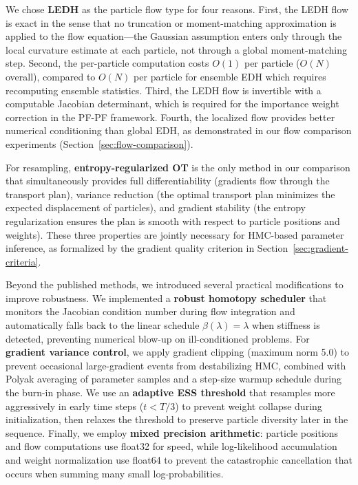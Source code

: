 \documentclass[12pt,a4paper]{article}
\theoremstyle{definition}
\theoremstyle{remark}
\begin{document}
We chose \textbf{LEDH} as the particle flow type for four reasons. First, the LEDH flow is exact in the sense that no truncation or moment-matching approximation is applied to the flow equation---the Gaussian assumption enters only through the local curvature estimate at each particle, not through a global moment-matching step. Second, the per-particle computation costs $O(1)$ per particle ($O(N)$ overall), compared to $O(N)$ per particle for ensemble EDH which requires recomputing ensemble statistics. Third, the LEDH flow is invertible with a computable Jacobian determinant, which is required for the importance weight correction in the PF-PF framework. Fourth, the localized flow provides better numerical conditioning than global EDH, as demonstrated in our flow comparison experiments (Section~\ref{sec:flow-comparison}).

For resampling, \textbf{entropy-regularized OT} is the only method in our comparison that simultaneously provides full differentiability (gradients flow through the transport plan), variance reduction (the optimal transport plan minimizes the expected displacement of particles), and gradient stability (the entropy regularization ensures the plan is smooth with respect to particle positions and weights). These three properties are jointly necessary for HMC-based parameter inference, as formalized by the gradient quality criterion in Section~\ref{sec:gradient-criteria}.

Beyond the published methods, we introduced several practical modifications to improve robustness. We implemented a \textbf{robust homotopy scheduler} that monitors the Jacobian condition number during flow integration and automatically falls back to the linear schedule $\beta(\lambda) = \lambda$ when stiffness is detected, preventing numerical blow-up on ill-conditioned problems. For \textbf{gradient variance control}, we apply gradient clipping (maximum norm 5.0) to prevent occasional large-gradient events from destabilizing HMC, combined with Polyak averaging of parameter samples and a step-size warmup schedule during the burn-in phase. We use an \textbf{adaptive ESS threshold} that resamples more aggressively in early time steps ($t < T/3$) to prevent weight collapse during initialization, then relaxes the threshold to preserve particle diversity later in the sequence. Finally, we employ \textbf{mixed precision arithmetic}: particle positions and flow computations use float32 for speed, while log-likelihood accumulation and weight normalization use float64 to prevent the catastrophic cancellation that occurs when summing many small log-probabilities.
\end{document}
